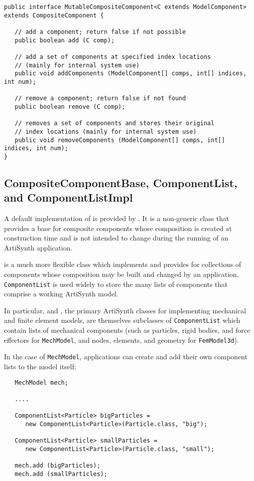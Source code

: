 \documentclass{article}
\begin{document}
\begin{lstlisting}
public interface MutableCompositeComponent<C extends ModelComponent>
extends CompositeComponent {

   // add a component; return false if not possible
   public boolean add (C comp);

   // add a set of components at specified index locations
   // (mainly for internal system use)
   public void addComponents (ModelComponent[] comps, int[] indices, int num);

   // remove a component; return false if not found
   public boolean remove (C comp);

   // removes a set of components and stores their original 
   // index locations (mainly for internal system use)
   public void removeComponents (ModelComponent[] comps, int[] indices, int num);
}
\end{lstlisting}

\subsection{CompositeComponentBase, ComponentList, and
ComponentListImpl}
\label{CompositeComponentBaseSec}

A default implementation of  is provided
by . It is a non-generic class that
provides a base for composite components whose composition is created
at construction time and is not intended to change during the
running of an ArtiSynth application.

 is a much more flexible class which
implements  and provides for
collections of components whose composition may be built and changed
by an application. {\tt ComponentList} is used widely to store the
many lists of components that comprise a working ArtiSynth model.

\javabase[]

In particular,  and
, the primary
ArtiSynth classes for implementing mechanical and finite element
models, are themselves subclasses of {\tt ComponentList} 
which contain lists of mechanical components (such as
particles, rigid bodies, and force effectors for {\tt MechModel},
and nodes, elements, and geometry for {\tt FemModel3d}).

In the case of {\tt MechModel}, applications can create and add their
own component lists to the model itself:
\begin{lstlisting}
   MechModel mech; 

   ....

   ComponentList<Particle> bigParticles =
      new ComponentList<Particle>(Particle.class, "big");

   ComponentList<Particle> smallParticles =
      new ComponentList<Particle>(Particle.class, "small");

   mech.add (bigParticles);
   mech.add (smallParticles);
\end{lstlisting}
\end{document}
